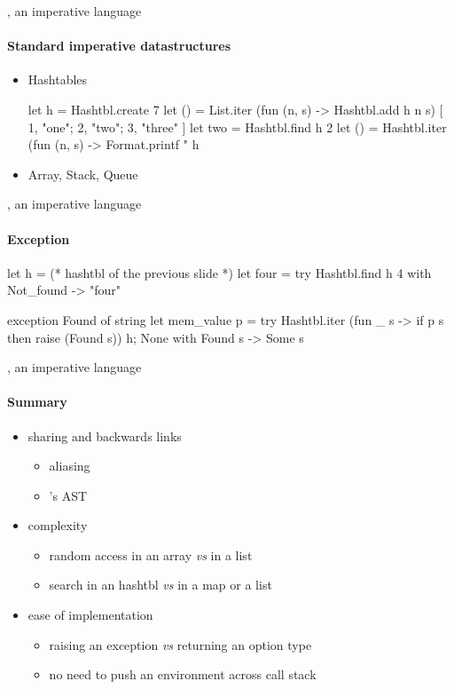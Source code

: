 \begin{frame}[fragile]{\ocaml, an imperative language}
  \framesubtitle{Standard imperative datastructures}

  \begin{itemize}
  \item Hashtables
\begin{ocamlcode}
let h = Hashtbl.create 7
let () = 
  List.iter
    (fun (n, s) -> Hashtbl.add h n s)
    [ 1, "one"; 2, "two"; 3, "three" ]
let two = Hashtbl.find h 2
let () = 
  Hashtbl.iter
    (fun (n, s) -> 
      Format.printf "%
    h
\end{ocamlcode}
  \item Array, Stack, Queue
  \end{itemize}
\end{frame}

\begin{frame}[fragile]{\ocaml, an imperative language}
  \framesubtitle{Exception}

    \begin{ocamlcode}
let h = (* hashtbl of the previous slide *)
let four = 
  try Hashtbl.find h 4 
  with Not_found -> "four"

exception Found of string
let mem_value p =
  try
    Hashtbl.iter
      (fun _ s -> if p s then raise (Found s))
      h;
    None
  with Found s ->
    Some s
  \end{ocamlcode}

\end{frame}

\begin{frame}{\ocaml, an imperative language}
\framesubtitle{Summary}

\begin{itemize}
\item sharing and backwards links 
  \begin{itemize}
  \item aliasing
  \item \framac's AST
  \end{itemize}
\item complexity 
  \begin{itemize}
  \item random access in an array \emph{vs} in a list
  \item search in an hashtbl \emph{vs} in a map or a list
  \end{itemize}
\item ease of implementation 
  \begin{itemize}
  \item raising an exception \emph{vs} returning an option type
  \item no need to push an environment across call stack
  \end{itemize}
\end{itemize}

\end{frame}
